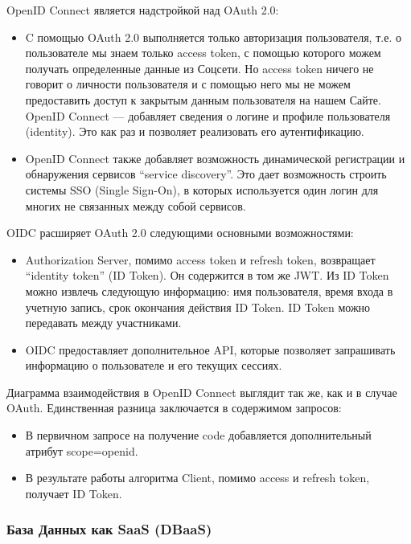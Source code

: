 OpenID Connect является надстройкой над OAuth 2.0:

\begin{itemize}
    \item C помощью OAuth 2.0 выполняется только авторизация пользователя, т.е. о пользователе мы знаем только access token, с помощью которого можем получать определенные данные из Соцсети. Но access token ничего не говорит о личности пользователя и с помощью него мы не можем предоставить доступ к закрытым данным пользователя на нашем Сайте. OpenID Connect — добавляет сведения о логине и профиле пользователя (identity). Это как раз и позволяет реализовать его аутентификацию.
    \item OpenID Connect также добавляет возможность динамической регистрации и обнаружения сервисов “service discovery”. Это дает возможность строить системы SSO (Single Sign-On), в которых используется один логин для многих не связанных между собой сервисов.\autocite{OpenIDConnect}
\end{itemize}

OIDC расширяет OAuth 2.0 следующими основными возможностями:

\begin{itemize}
    \item Authorization Server, помимо access token и refresh token, возвращает “identity token” (ID Token). Он содержится в том же JWT. Из ID Token можно извлечь следующую информацию: имя пользователя, время входа в учетную запись, срок окончания действия ID Token. ID Token можно передавать между участниками.
    \item OIDC предоставляет дополнительное API, которые позволяет запрашивать информацию о пользователе и его текущих сессиях.\autocite{IDToken}
\end{itemize}

Диаграмма взаимодействия в OpenID Connect выглядит так же, как и в случае OAuth. Единственная разница заключается в содержимом запросов:

\begin{itemize}
    \item В первичном запросе на получение code добавляется дополнительный атрибут scope=openid.
    \item В результате работы алгоритма Client, помимо access и refresh token, получает ID Token.\autocite{IDToken}
\end{itemize}

\subsubsection{База Данных как SaaS (DBaaS)}

